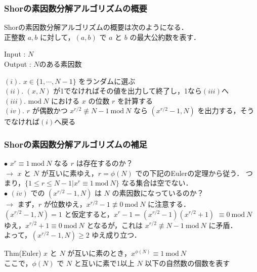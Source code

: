 \documentclass[dvipdfmx,12pt]{beamer}
\begin{document}
\begin{frame}

\frametitle{Shorの素因数分解アルゴリズムの概要}
      
Shorの素因数分解アルゴリズムの概要は次のようになる．\\
正整数 $ a, b $ に対して，$ (a, b) $ で $a$ と $b$ の最大公約数を表す．\\

\vspace{10pt}

Input : $N$ \\
Output : $N$のある素因数 \\

\vspace{10pt}

$(i)$. $ x \in \{ 1, \cdots, N - 1 \} $ をランダムに選ぶ \\
$(ii)$. $ (x, N) $ が1でなければその値を出力して終了し，1なら$(iii)$へ \\
$(iii)$. $ \mathrm{mod} \ N $ における $x$ の位数 $r$ を計算する \\
$(iv)$. $r$ が偶数かつ $ x^{r/2} \not\equiv N - 1 \ \mathrm{mod} \ N $ なら $ (x^{r/2} - 1, N) $ を出力する，そうでなければ$(i)$へ戻る
          
\end{frame}


\begin{frame}

\frametitle{Shorの素因数分解アルゴリズムの補足}
          
$ \bullet $ $ x^r \equiv 1 \ \mathrm{mod} \ N $ なる $r$ は存在するのか？ \\
$ \rightarrow $ $x$ と $N$ が互いに素ゆえ，$                                             r = \phi(N) $ での下記のEulerの定理から従う．
つまり，$ \{ 1 \leq r \leq N - 1 | x^r \equiv 1 \ \mathrm{mod} \ N \} $ なる集合は空でない． \\
$ \bullet $ $ (iv) $ での $ (x^{r/2} - 1, N) $ は $N$ の素因数になっているのか？ \\
$ \rightarrow $ まず，$r$ が位数ゆえ，$ x^{r/2} - 1 \not\equiv 0 \ \mathrm{mod} \ N $ に注意する． \\
$ (x^{r/2} - 1, N) = 1 $ と仮定すると，$ x^r - 1 = (x^{r/2} - 1)(x^{r/2} + 1) $  $ \equiv 0 \ \mathrm{mod} \ N $ ゆえ，$ x^{r/2} + 1 \equiv 0 \ \mathrm{mod} \ N $ となるが，これは $ x^{r/2} \not\equiv N - 1 \ \mathrm{mod} \ N $ に矛盾． \\
よって，$ (x^{r/2} - 1, N) \geq 2 $ ゆえ成り立つ．

\vspace{10pt}

\begin{itembox}[l]{Thm(Euler)}
    $x$ と $N$ が互いに素のとき，$ x^{\phi(N)} \equiv 1 \ \mathrm{mod} \ N $ \\
    ここで，$ \phi(N) $ で $N$ と互いに素で1以上 $ N $ 以下の自然数の個数を表す
\end{itembox} 

\end{frame}
\end{document}
